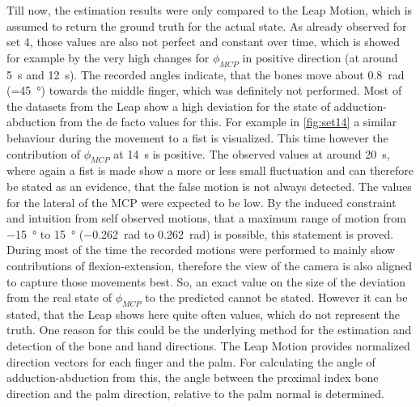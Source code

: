 Till now, the estimation results were only compared to the Leap Motion, which is assumed to return the ground truth for the actual state. As already observed for set 4, those values are also not perfect and constant over time, which is showed for example by the very high changes for $ \phi_{MCP} $ in positive direction (at around \SI{5}{\second} and \SI{12}{\second}). The recorded angles indicate, that the bones move about \SI{0.8}{\radian} (=\SI{45}{\degree}) towards the middle finger, which was definitely not performed. Most of the datasets from the Leap show a high deviation for the state of adduction-abduction from the de facto values for this. For example in \ref{fig:set14} a similar behaviour during the movement to a fist is visualized. This time however the contribution of $ \phi_{MCP} $ at \SI{14}{\second} is positive. The observed values at around \SI{20}{\second}, where again a fist is made show a more or less small fluctuation and can therefore be stated as an evidence, that the false motion is not always detected. The values for the lateral of the \ac{MCP} were expected to be low. By the induced constraint and intuition from self observed motions, that a maximum range of motion from \SI{-15}{\degree} to \SI{+15}{\degree} (\SI{-0.262}{\radian} to \SI{+0.262}{\radian}) is possible, this statement is proved. During most of the time the recorded motions were performed to mainly show contributions of flexion-extension, therefore the view of the camera is also aligned to capture those movements best. So, an exact value on the size of the deviation from the real state of $ \phi_{MCP} $ to the predicted cannot be stated. However it can be stated, that the Leap shows here quite often values, which do not represent the truth. One reason for this could be the underlying method for the estimation and detection of the bone and hand directions. The Leap Motion provides normalized direction vectors for each finger and the palm. For calculating the angle of adduction-abduction from this, the angle between the proximal index bone direction and the palm direction, relative to the palm normal is determined. 
